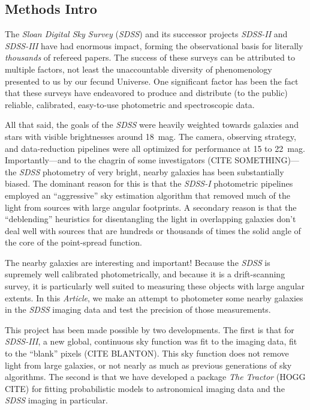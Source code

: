 \documentclass[12pt,preprint,pdftex]{aastex}
\newcommand{\project}[1]{\textsl{#1}}
\newcommand{\documentname}{\textsl{Article}}
\begin{document}
\subsection{Methods Intro}
The \project{Sloan Digital Sky Survey} (\project{SDSS}) and its
successor projects \project{SDSS-II} and \project{SDSS-III} have had
enormous impact, forming the observational basis for literally
\emph{thousands} of refereed papers.  The success of these surveys can
be attributed to multiple factors, not least the unaccountable
diversity of phenomenology presented to us by our fecund Universe.
One significant factor has been the fact that these surveys have
endeavored to produce and distribute (to the public) reliable,
calibrated, easy-to-use photometric and spectroscopic data.

All that said, the goals of the \project{SDSS} were heavily weighted
towards galaxies and stars with visible brightnesses around 18~mag.
The camera, observing strategy, and data-reduction pipelines were all
optimized for performance at 15 to 22~mag.  Importantly---and to the
chagrin of some investigators (CITE SOMETHING)---the \project{SDSS}
photometry of very bright, nearby galaxies has been substantially
biased.  The dominant reason for this is that the \project{SDSS-I}
photometric pipelines employed an ``aggressive'' sky estimation
algorithm that removed much of the light from sources with large
angular footprints.  A secondary reason is that the ``deblending''
heuristics for disentangling the light in overlapping galaxies don't
deal well with sources that are hundreds or thousands of times the
solid angle of the core of the point-spread function.

The nearby galaxies are interesting and important!  Because the
\project{SDSS} is supremely well calibrated photometrically, and
because it is a drift-scanning survey, it is particularly well suited
to measuring these objects with large angular extents.  In this
\documentname, we make an attempt to photometer some nearby galaxies
in the \project{SDSS} imaging data and test the precision of those
measurements.

This project has been made possible by two developments.  The first is
that for \project{SDSS-III}, a new global, continuous sky function was
fit to the imaging data, fit to the ``blank'' pixels (CITE BLANTON).  This sky
function does not remove light from large galaxies, or not nearly as
much as previous generations of sky algorithms.  The second is that we
have developed a package \project{The Tractor} (HOGG CITE) for fitting
probabilistic models to astronomical imaging data and the
\project{SDSS} imaging in particular.
\end{document}
